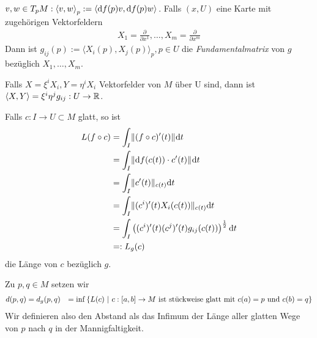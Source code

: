 \documentclass{skript}
\begin{document}
$v,w \in T_p M : \sprod[p]{v,w} := \sprod{\d f(p)v, \d f(p)w}$. Falls
$(x, U)$ eine Karte mit zugehörigen Vektorfeldern
\begin{align}
  X_1 = \frac{\partial}{\partial x^1}, \dots, X_m = \frac{\partial}{\partial x^m}
\end{align}
Dann ist $g_{ij}(p) := \langle X_i(p), X_j(p)\rangle_p, p\in U$ die
\emph{Fundamentalmatrix} von $g$ bezüglich $X_1, \dots, X_m$.

Falls $X = \xi^iX_i, Y = \eta^iX_i$ Vektorfelder von $M$ über U sind, dann ist
$\langle X, Y\rangle = \xi^i\eta^jg_{ij} : U \to \mathbb{R}$.

Falls $c : I \to U \subset M$ glatt, so ist
\begin{align*}
  L(f\circ c) &= \int_I\norm{(f\circ c)'(t)}\d t \\
              &= \int_I\norm{\d f(c(t)) \cdot c'(t)}\d t \\
              &= \int_I\norm[c(t)]{c'(t)} \d t \\
              &= \int_I\norm[c(t)]{(c^i)'(t)X_i(c(t))} \d t \\
              &= \int_I\left( (c^i)'(t)(c^j)'(t)g_{ij}(c(t))
              \right)^{\frac{1}{2}}\d t \\
              &=: L_g(c)
\end{align*}
die Länge von $c$ bezüglich $g$.

Zu $p,q\in M$ setzen wir
\begin{align}
  d(p,q) &= d_g(p,q) &= \inf\mdef[L(c)]{c:[a,b]\to M \text{ ist stückweise glatt
  mit } c(a) = p \text{ und  } c(b) = q}
\end{align}
Wir definieren also den Abstand als das Infimum der Länge aller glatten Wege von
$p$ nach $q$ in der Mannigfaltigkeit.
\end{document}

